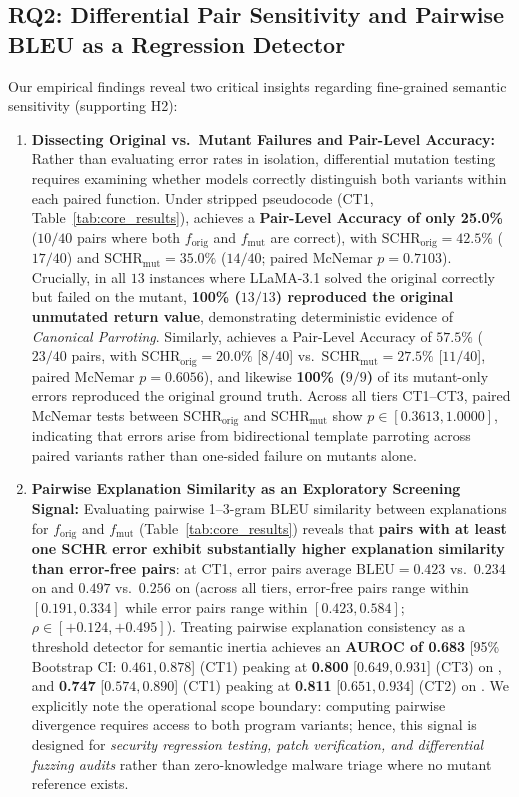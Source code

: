 \documentclass[runningheads]{llncs}
\begin{document}
\subsection{RQ2: Differential Pair Sensitivity and Pairwise BLEU as a Regression Detector}
Our empirical findings reveal two critical insights regarding fine-grained semantic sensitivity (supporting H2):
\begin{enumerate}
    \item \textbf{Dissecting Original vs.\ Mutant Failures and Pair-Level Accuracy:} Rather than evaluating error rates in isolation, differential mutation testing requires examining whether models correctly distinguish both variants within each paired function. Under stripped pseudocode (CT1, Table~\ref{tab:core_results}),  achieves a \textbf{Pair-Level Accuracy of only 25.0\%} ($10/40$ pairs where both $f_{\text{orig}}$ and $f_{\text{mut}}$ are correct), with $\text{SCHR}_{\text{orig}} = 42.5\%$ ($17/40$) and $\text{SCHR}_{\text{mut}} = 35.0\%$ ($14/40$; paired McNemar $p = 0.7103$). Crucially, in all $13$ instances where LLaMA-3.1 solved the original correctly but failed on the mutant, \textbf{100\% ($13/13$) reproduced the original unmutated return value}, demonstrating deterministic evidence of \textit{Canonical Parroting}. Similarly,  achieves a Pair-Level Accuracy of $57.5\%$ ($23/40$ pairs, with $\text{SCHR}_{\text{orig}} = 20.0\%$ [$8/40$] vs.\ $\text{SCHR}_{\text{mut}} = 27.5\%$ [$11/40$], paired McNemar $p = 0.6056$), and likewise \textbf{100\% ($9/9$)} of its mutant-only errors reproduced the original ground truth. Across all tiers CT1--CT3, paired McNemar tests between $\text{SCHR}_{\text{orig}}$ and $\text{SCHR}_{\text{mut}}$ show $p \in [0.3613, 1.0000]$, indicating that errors arise from bidirectional template parroting across paired variants rather than one-sided failure on mutants alone.
    \item \textbf{Pairwise Explanation Similarity as an Exploratory Screening Signal:} Evaluating pairwise 1--3-gram BLEU similarity between explanations for $f_{\text{orig}}$ and $f_{\text{mut}}$ (Table~\ref{tab:core_results}) reveals that \textbf{pairs with at least one SCHR error exhibit substantially higher explanation similarity than error-free pairs}: at CT1, error pairs average $\text{BLEU} = 0.423$ vs.\ $0.234$ on  and $0.497$ vs.\ $0.256$ on  (across all tiers, error-free pairs range within $[0.191, 0.334]$ while error pairs range within $[0.423, 0.584]$; $\rho \in [+0.124, +0.495]$). Treating pairwise explanation consistency as a threshold detector for semantic inertia achieves an \textbf{AUROC of 0.683} [95\% Bootstrap CI: $0.461, 0.878$] (CT1) peaking at \textbf{0.800} [$0.649, 0.931$] (CT3) on , and \textbf{0.747} [$0.574, 0.890$] (CT1) peaking at \textbf{0.811} [$0.651, 0.934$] (CT2) on . We explicitly note the operational scope boundary: computing pairwise divergence requires access to both program variants; hence, this signal is designed for \textit{security regression testing, patch verification, and differential fuzzing audits} rather than zero-knowledge malware triage where no mutant reference exists.
\end{enumerate}
\end{document}
